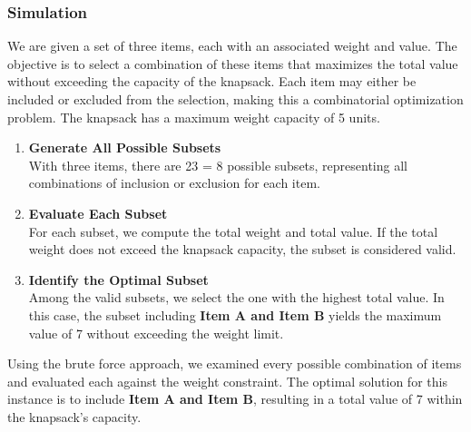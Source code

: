 \subsubsection{Simulation}

We are given a set of three items, each with an associated weight and value. The objective is to select a combination of these items that maximizes the total value without exceeding the capacity of the knapsack. Each item may either be included or excluded from the selection, making this a combinatorial optimization problem. The knapsack has a maximum weight capacity of 5 units.


\begin{enumerate}[label=\textbf{Step \arabic*:}]
    \item \textbf{Generate All Possible Subsets} \\
        With three items, there are 23 = 8 possible subsets, representing all combinations of inclusion or exclusion for each item.


    \item \textbf{Evaluate Each Subset} \\
        For each subset, we compute the total weight and total value. If the total weight does not exceed the knapsack capacity, the subset is considered valid.


    \item \textbf{Identify the Optimal Subset} \\
        Among the valid subsets, we select the one with the highest total value. In this case, the subset including \textbf{Item A and Item B} yields the maximum value of 7 without exceeding the weight limit.
\end{enumerate}


Using the brute force approach, we examined every possible combination of items and evaluated each against the weight constraint. The optimal solution for this instance is to include \textbf{Item A and Item B}, resulting in a total value of 7 within the knapsack's capacity.

